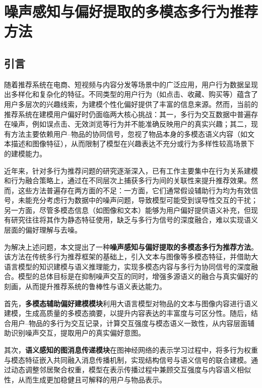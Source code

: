 
\chapter{噪声感知与偏好提取的多模态多行为推荐方法}

\section{引言}

随着推荐系统在电商、短视频与内容分发等场景中的广泛应用，用户行为数据呈现出多样化和复杂化的特征。不同类型的用户行为（如点击、收藏、购买等）蕴含了用户多层次的兴趣线索，为建模个性化偏好提供了丰富的信息来源。然而，当前的推荐系统在建模用户偏好时仍面临两大核心挑战：其一，多行为交互数据中普遍存在噪声，例如误点击、无效浏览等行为并不能准确反映用户的真实兴趣；其二，现有方法主要依赖用户–物品的协同信号，忽视了物品本身的多模态语义内容（如文本描述和图像特征），从而限制了模型在兴趣表达不充分或行为多样性较高场景下的建模能力。

近年来，针对多行为推荐问题的研究逐渐深入，已有工作主要集中在行为关系建模和行为融合策略上，通过在不同层次上捕获多行为间的关联性来提升推荐效果。然而，这些方法普遍存在两方面的不足：一方面，它们通常假设辅助行为均为有效信号，未能充分考虑行为数据中的噪声问题，导致模型可能受到误导性交互的干扰；另一方面，尽管多模态信息（如图像和文本）能够为用户偏好提供语义补充，但现有研究往往将其作为静态特征使用，缺乏与多行为信号的深度融合，难以实现语义层面的偏好理解与去噪。

为解决上述问题，本文提出了一种\textbf{噪声感知与偏好提取的多模态多行为推荐方法}。该方法在传统多行为推荐框架的基础上，引入文本与图像等多模态特征，并借助大语言模型的知识建模与语义推理能力，实现多模态内容与多行为协同信号的深度融合。模型的总体目标是在抑制噪声交互的同时，增强多源语义的融合与真实偏好的刻画，从而提升推荐系统的鲁棒性与语义表达能力。

首先，\textbf{多模态辅助偏好建模模块}利用大语言模型对物品的文本与图像内容进行语义建模，生成高质量的多模态摘要，以提升内容表达的丰富度与可区分性。随后，结合用户–物品的多行为交互记录，计算交互强度与模态语义一致性，从内容层面辅助识别噪声交互，提取用户的真实偏好意图。

其次，\textbf{语义感知的图消息传递模块}在图神经网络的表示学习过程中，将多行为权重与模态特征嵌入共同融入消息传播机制，实现结构信号与语义信号的联合建模。通过动态调整邻居聚合权重，模型在表示传播过程中兼顾交互强度与内容语义相似性，从而生成更加稳健且可解释的用户与物品表示。

